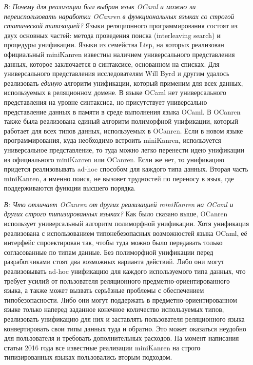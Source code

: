 \emph{В: Почему для реализации был выбран язык OCaml и можно ли переиспользовать наработки OCanren в функциональных языках со строгой статической типизацией?}
Языки реляционного программирования состоят из двух основных частей: метода проведения поиска (interleaving search) и процедуры унификации.
Языки из семейства Lisp, на которых реализован официальный miniKanren известны наличием универсального представления данных, которое заключается в синтаксисе, основанном на списках. Для универсального представления исследователям Will Byrd и другим удалось реализовать 
\emph{единую} алгоритм унификации, который применим для всех данных, используемых в реляционном домене. В языке OCaml нет универсального представления на уровне синтаксиса, но присутствует универсально представление данных в памяти в среде выполнения языка OCaml. В OCanren также была реализована единый алгоритм полиморфной унификации, который работает для всех типов данных, используемых в OCanren. Если в новом языке программирования, куда необходимо встроить miniKanren, используется универсальное представление, то туда можно легко перенести идею унификации из официального miniKanren или OCanren. Если же нет, то унификацию придется реализовывать ad-hoc способом для каждого типа данных. Вторая часть miniKanren, а именно поиск,  не вызовет трудностей по переносу в язык, где поддерживаются функции высшего порядка.

\emph{В: Что отличает OCanren от других реализацией miniKanren на OCaml и других строго типизированных языках?} Как было сказано выше, OCanren использует универсальный алгоритм полиморфной унификации. Хотя унификация реализована с использованием типонебезопасных возможностей языка OCaml, её интерфейс спроектирован так, чтобы туда можно было передавать только согласованные по типам данные. Без полиморфной унификации перед разработчиками стоят два возможных варианта действий. Либо они могут реализовывать ad-hoc унификацию для каждого используемого типа данных, что требует усилий от пользователя реляционного предметно-ориентированного языка, а также может вызвать серьёзные проблемы с обеспечением типобезопасности. Либо они могут поддержать в предметно-ориентированном языке только наперед заданное конечное количество используемых типов, реализовать унификацию для них и заставлять пользователя реляционного языка конвертировать свои типы данных туда и обратно. Это может оказаться неудобно для пользователя и требовать дополнительных расходов. На момент написания статьи 2016 года все известные реализации miniKanren на строго типизированных языках пользовались вторым подходом.


